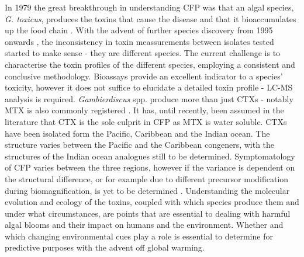 
In 1979 the great breakthrough in understanding CFP was that an algal species, \emph{G. toxicus}, produces the toxins that cause the disease and that it bioaccumulates up the food chain \citep{adachi1979thecal}. With the advent of further species discovery from 1995 onwards \cite{faust1995observation}, the inconsistency in toxin meassurements between isolates tested started to make sense - they are different species. The current challenge is to characterise the toxin profiles of the different species, employing a consistent and conclusive methodology. Bioassays provide an excellent indicator to a species' toxicity, however it does not suffice to elucidate a detailed toxin profile - LC-MS analysis is required. \emph{Gambierdiscus} spp. produce more than just CTXs - notably MTX is also commonly registered \cite{holmes1994purification,murata1993structure}. It has, until recently, been assumed in the literature that CTX is the sole culprit in CFP as MTX is water soluble. CTXs have been isolated form the Pacific, Caribbean and the Indian ocean. The  structure varies between the Pacific and the Caribbean congeners, with the structures of the Indian ocean analogues still to be determined. Symptomatology of CFP varies between the three regions, however if the variance is dependent on  the structural difference, or for example due to different precursor modification during biomagnification, is yet to be determined \cite{lewis2006ciguatera}. Understanding the molecular evolution and ecology of the toxins, coupled with which species produce them and under what circumstances, are points that are essential to dealing with harmful algal blooms and their impact on humans and the environment. Whether and which changing environmental cues play a role is essential to determine for predictive purposes with the advent off global warming.  \\


